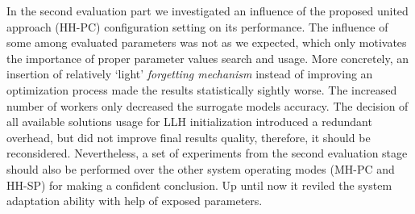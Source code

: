 In the second evaluation part we investigated an influence of the proposed united approach (HH-PC) configuration setting on its performance. The influence of some among evaluated parameters was not as we expected, which only motivates the importance of proper parameter values search and usage. More concretely, an insertion of relatively `light' \emph{forgetting mechanism} instead of improving an optimization process made the results statistically sightly worse. The increased number of workers only decreased the surrogate models accuracy. The decision of all available solutions usage for LLH initialization introduced a redundant overhead, but did not improve final results quality, therefore, it should be reconsidered. Nevertheless, a set of experiments from the second evaluation stage should also be performed over the other system operating modes (MH-PC and HH-SP) for making a confident conclusion. Up until now it reviled the system adaptation ability with help of exposed parameters.
